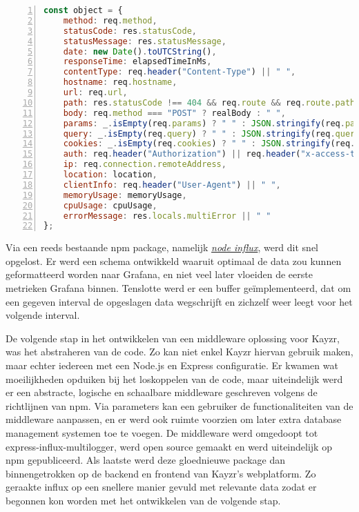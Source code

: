 \begin{lstlisting}[language=JavaScript, breaklines=true, numbers=left, frame=single, caption={Log object},label=code:multilogLogObject]
const object = {
	method: req.method,
	statusCode: res.statusCode,
	statusMessage: res.statusMessage,
	date: new Date().toUTCString(),
	responseTime: elapsedTimeInMs,
	contentType: req.header("Content-Type") || " ",
	hostname: req.hostname,
	url: req.url,
	path: res.statusCode !== 404 && req.route && req.route.path ? req.route.path : "No Path",
	body: req.method === "POST" ? realBody : " ",
	params: _.isEmpty(req.params) ? " " : JSON.stringify(req.params),
	query: _.isEmpty(req.query) ? " " : JSON.stringify(req.query),
	cookies: _.isEmpty(req.cookies) ? " " : JSON.stringify(req.cookies),
	auth: req.header("Authorization") || req.header("x-access-token") || " ",
	ip: req.connection.remoteAddress,
	location: location,
	clientInfo: req.header("User-Agent") || " ",
	memoryUsage: memoryUsage,
	cpuUsage: cpuUsage,
	errorMessage: res.locals.multiError || " "
};

\end{lstlisting}

Via een reeds bestaande npm package, namelijk \href{https://github.com/node-influx/node-influx}{\textit{node influx}}, werd dit snel opgelost. Er werd een schema ontwikkeld waaruit optimaal de data zou kunnen geformatteerd worden naar Grafana, en niet veel later vloeiden de eerste metrieken Grafana binnen. Tenslotte werd er een buffer geïmplementeerd, dat om een gegeven interval de opgeslagen data wegschrijft en zichzelf weer leegt voor het volgende interval. 

De volgende stap in het ontwikkelen van een middleware oplossing voor Kayzr, was het abstraheren van de code. Zo kan niet enkel Kayzr hiervan gebruik maken, maar echter iedereen met een Node.js en Express configuratie. Er kwamen wat moeilijkheden opduiken bij het loskoppelen van de code, maar uiteindelijk werd er een abstracte, logische en schaalbare middleware geschreven volgens de richtlijnen van npm. Via parameters kan een gebruiker de functionaliteiten van de middleware aanpassen, en er werd ook ruimte voorzien om later extra database management systemen toe te voegen. De middleware werd omgedoopt tot express-influx-multilogger, werd open source gemaakt en werd uiteindelijk op npm gepubliceerd. Als laatste werd deze gloednieuwe package dan binnengetrokken op de backend en frontend van Kayzr's webplatform. Zo geraakte influx op een snellere manier gevuld met relevante data zodat er begonnen kon worden met het ontwikkelen van de volgende stap. 

